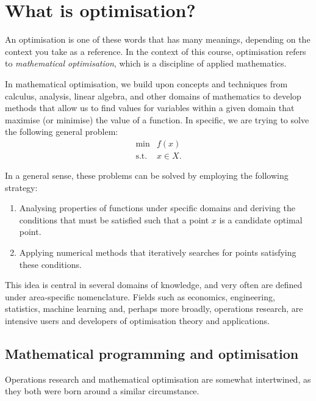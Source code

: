 \section{What is optimisation?}

An optimisation is one of these words that has many meanings, depending on the context you take as a reference. In the context of this course, optimisation refers to \emph{mathematical optimisation}, which is a discipline of applied mathematics.

In mathematical optimisation, we build upon concepts and techniques from calculus, analysis, linear algebra, and other domains of mathematics to develop methods that allow us to find values for variables within a given domain that maximise (or minimise) the value of a function. In specific, we are trying to solve the following general problem:
%
\begin{align}
    \min &f(x) \label{eq:opt_prob} \\
    \text{s.t.}   &x \in X. \nonumber
\end{align}
%

In a general sense, these problems can be solved by employing the following strategy:
%
\begin{enumerate}
    \item Analysing properties of functions under specific domains and deriving the conditions that must be satisfied such that a point $x$ is a candidate optimal point.
    \item Applying numerical methods that iteratively searches for points satisfying these conditions. 
\end{enumerate}
%
This idea is central in several domains of knowledge, and very often are defined under area-specific nomenclature. Fields such as economics, engineering, statistics, machine learning and, perhaps more broadly, operations research, are intensive users and developers of optimisation theory and applications. 

\subsection{Mathematical programming and optimisation}

Operations research and mathematical optimisation are somewhat intertwined, as they both were born around a similar circumstance. %

